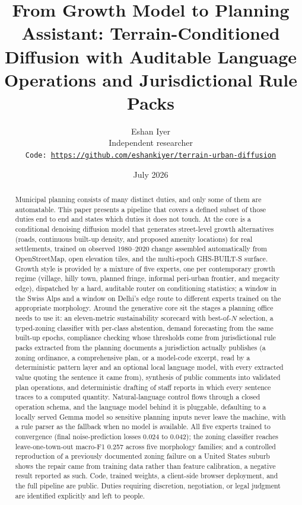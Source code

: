 \documentclass[11pt]{article}
\title{From Growth Model to Planning Assistant: Terrain-Conditioned
Diffusion with Auditable Language Operations and Jurisdictional Rule
Packs}
\author{Eshan Iyer\\
\small Independent researcher\\
\small \texttt{Code: \url{https://github.com/eshankiyer/terrain-urban-diffusion}}}
\date{July 2026}
\begin{document}
\maketitle

\begin{abstract}
Municipal planning consists of many distinct duties, and only some of
them are automatable. This paper presents a pipeline that covers a
defined subset of those duties end to end and states which duties it
does not touch. At the core is a conditional denoising diffusion model
that generates street-level growth alternatives (roads, continuous
built-up density, and proposed amenity locations) for real settlements,
trained on observed 1980--2020 change assembled automatically from
OpenStreetMap, open elevation tiles, and the multi-epoch GHS-BUILT-S
surface. Growth style is provided by a mixture of five experts, one per
contemporary growth regime (village, hilly town, planned fringe,
informal peri-urban frontier, and megacity edge), dispatched by a hard,
auditable router on conditioning statistics; a window in the Swiss Alps
and a window on Delhi's edge route to different experts trained on the
appropriate morphology. Around the generative core sit the stages a
planning office needs to use it: an eleven-metric sustainability
scorecard with best-of-$N$ selection, a typed-zoning classifier with
per-class abstention, demand forecasting from the same built-up epochs,
compliance checking whose thresholds come from jurisdictional rule
packs extracted from the planning documents a jurisdiction actually
publishes (a zoning ordinance, a comprehensive plan, or a model-code
excerpt, read by a deterministic pattern layer and an optional local
language model, with every extracted value quoting the sentence it
came from), synthesis of public comments into validated
plan operations, and deterministic drafting of staff reports in which
every sentence traces to a computed quantity. Natural-language control
flows through a closed operation schema, and the language model behind
it is pluggable, defaulting to a locally served Gemma model so
sensitive planning inputs never leave the machine, with a rule parser
as the fallback when no model is available. All five experts trained to
convergence (final noise-prediction losses 0.024 to 0.042); the zoning
classifier reaches leave-one-town-out macro-F1 0.257 across five
morphology families; and a controlled reproduction of a previously
documented zoning failure on a United States suburb shows the repair
came from training data rather than feature calibration, a negative
result reported as such. Code, trained weights, a client-side browser
deployment, and the full pipeline are public. Duties requiring
discretion, negotiation, or legal judgment are identified explicitly
and left to people.
\end{abstract}
\end{document}
